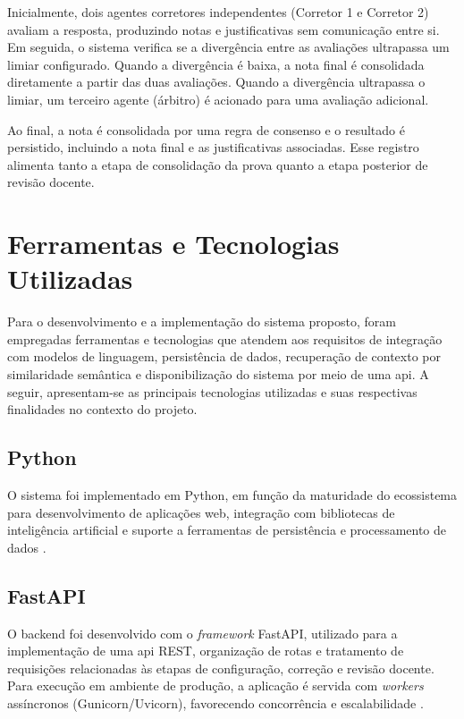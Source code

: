 Inicialmente, dois agentes corretores independentes (Corretor 1 e Corretor 2) avaliam a resposta, produzindo notas e justificativas sem comunicação entre si. Em seguida, o sistema verifica se a divergência entre as avaliações ultrapassa um limiar configurado. Quando a divergência é baixa, a nota final é consolidada diretamente a partir das duas avaliações. Quando a divergência ultrapassa o limiar, um terceiro agente (árbitro) é acionado para uma avaliação adicional.

Ao final, a nota é consolidada por uma regra de consenso e o resultado é persistido, incluindo a nota final e as justificativas associadas. Esse registro alimenta tanto a etapa de consolidação da prova quanto a etapa posterior de revisão docente.

\section{Ferramentas e Tecnologias Utilizadas}

Para o desenvolvimento e a implementação do sistema proposto, foram empregadas ferramentas e tecnologias que atendem aos requisitos de integração com modelos de linguagem, persistência de dados, recuperação de contexto por similaridade semântica e disponibilização do sistema por meio de uma \gls{api}. A seguir, apresentam-se as principais tecnologias utilizadas e suas respectivas finalidades no contexto do projeto.

\subsection{Python}
O sistema foi implementado em Python, em função da maturidade do ecossistema para desenvolvimento de aplicações web, integração com bibliotecas de inteligência artificial e suporte a ferramentas de persistência e processamento de dados \cite{python_docs_2026}.

\subsection{FastAPI}
O backend foi desenvolvido com o \textit{framework} FastAPI, utilizado para a implementação de uma \gls{api} REST, organização de rotas e tratamento de requisições relacionadas às etapas de configuração, correção e revisão docente. Para execução em ambiente de produção, a aplicação é servida com \textit{workers} assíncronos (Gunicorn/Uvicorn), favorecendo concorrência e escalabilidade \cite{fastapi_docs_2026,gunicorn_docs_2026,uvicorn_docs_2026}.

